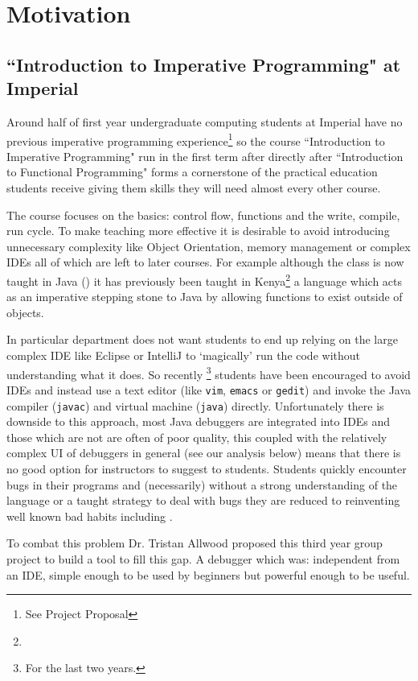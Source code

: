 \documentclass[11pt, a4paper]{article}
\newcommand{\cmd}[1]{{\tt #1}}
\begin{document}
\clearpage
\tableofcontents
\clearpage

\section{Motivation}
\subsection{``Introduction to Imperative Programming" at Imperial}
Around half of first year undergraduate computing students at Imperial have no previous imperative programming experience\footnote{See Project Proposal} so the course ``Introduction to Imperative Programming" run in the first term after directly after ``Introduction to Functional Programming" forms a cornerstone of the practical education students receive giving them skills they will need almost every other course.

The course focuses on the basics: control flow, functions and the write, compile, run cycle.
To make teaching more effective it is desirable to avoid introducing unnecessary complexity like Object Orientation, memory management or complex IDEs all of which are left to later courses.
For example although the class is now taught in Java () it has previously been taught in Kenya\footnote{} a language which acts as an imperative stepping stone to Java by allowing functions to exist outside of objects.

In particular department does not want students to end up relying on the large complex IDE like Eclipse or IntelliJ to `magically' run the code without understanding what it does.
So recently  \footnote{For the last two years.} students have been encouraged to avoid IDEs and instead use a text editor (like \cmd{vim}, \cmd{emacs} or \cmd{gedit}) and invoke the Java compiler (\cmd{javac}) and virtual machine (\cmd{java}) directly.
Unfortunately there is downside to this approach, most Java debuggers are integrated into IDEs and those which are not are often of poor quality, this coupled with the relatively complex UI of debuggers in general (see our analysis below) means that there is no good option for instructors to suggest to students.
Students quickly encounter bugs in their programs and (necessarily) without a strong understanding of the language or a taught strategy to deal with bugs they are reduced to reinventing well known bad habits including .

To combat this problem Dr. Tristan Allwood proposed this third year group project to build a tool to fill this gap.
A debugger which was: independent from an IDE, simple enough to be used by beginners but powerful enough to be useful.
\end{document}
